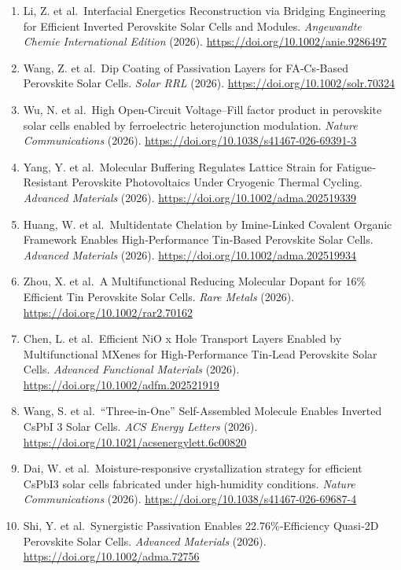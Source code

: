 \documentclass[
  11pt,
]{article}
\begin{document}
\begin{enumerate}
  \url{https://doi.org/10.1002/inf2.70140}
\item
  Li, Z. et al.~Interfacial Energetics Reconstruction via Bridging
  Engineering for Efficient Inverted Perovskite Solar Cells and Modules.
  \emph{Angewandte Chemie International Edition} (2026).
  \url{https://doi.org/10.1002/anie.9286497}
\item
  Wang, Z. et al.~Dip Coating of Passivation Layers for FA‐Cs‐Based
  Perovskite Solar Cells. \emph{Solar RRL} (2026).
  \url{https://doi.org/10.1002/solr.70324}
\item
  Wu, N. et al.~High Open-Circuit Voltage--Fill factor product in
  perovskite solar cells enabled by ferroelectric heterojunction
  modulation. \emph{Nature Communications} (2026).
  \url{https://doi.org/10.1038/s41467-026-69391-3}
\item
  Yang, Y. et al.~Molecular Buffering Regulates Lattice Strain for
  Fatigue‐Resistant Perovskite Photovoltaics Under Cryogenic Thermal
  Cycling. \emph{Advanced Materials} (2026).
  \url{https://doi.org/10.1002/adma.202519339}
\item
  Huang, W. et al.~Multidentate Chelation by Imine‐Linked Covalent
  Organic Framework Enables High‐Performance Tin‐Based Perovskite Solar
  Cells. \emph{Advanced Materials} (2026).
  \url{https://doi.org/10.1002/adma.202519934}
\item
  Zhou, X. et al.~A Multifunctional Reducing Molecular Dopant for 16\%
  Efficient Tin Perovskite Solar Cells. \emph{Rare Metals} (2026).
  \url{https://doi.org/10.1002/rar2.70162}
\item
  Chen, L. et al.~Efficient NiO x Hole Transport Layers Enabled by
  Multifunctional MXenes for High‐Performance Tin‐Lead Perovskite Solar
  Cells. \emph{Advanced Functional Materials} (2026).
  \url{https://doi.org/10.1002/adfm.202521919}
\item
  Wang, S. et al.~``Three-in-One'' Self-Assembled Molecule Enables
  Inverted CsPbI 3 Solar Cells. \emph{ACS Energy Letters} (2026).
  \url{https://doi.org/10.1021/acsenergylett.6c00820}
\item
  Dai, W. et al.~Moisture-responsive crystallization strategy for
  efficient CsPbI3 solar cells fabricated under high-humidity
  conditions. \emph{Nature Communications} (2026).
  \url{https://doi.org/10.1038/s41467-026-69687-4}
\item
  Shi, Y. et al.~Synergistic Passivation Enables 22.76\%‐Efficiency
  Quasi‐2D Perovskite Solar Cells. \emph{Advanced Materials} (2026).
  \url{https://doi.org/10.1002/adma.72756}

\end{enumerate}
\end{document}
